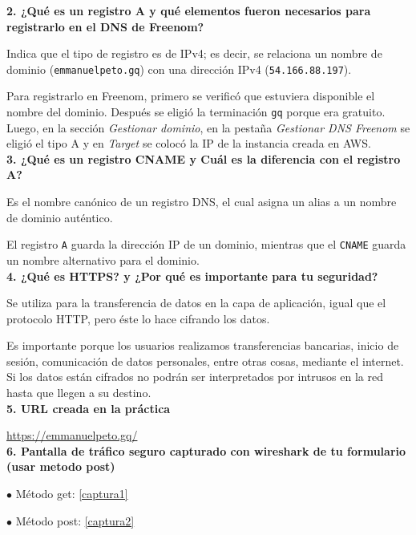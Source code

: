 \documentclass{article}
\begin{document}
\textbf{2. ¿Qué es un registro A y qué elementos fueron necesarios para registrarlo en el DNS de Freenom?}

Indica que el tipo de registro es de IPv4; es decir, se relaciona un nombre de dominio (\texttt{emmanuelpeto.gq}) con una dirección IPv4 (\texttt{54.166.88.197}).

Para registrarlo en Freenom, primero se verificó que estuviera disponible el nombre del dominio. Después se eligió la terminación \texttt{gq} porque era gratuito. Luego, en la sección \textit{Gestionar dominio}, en la pestaña \textit{Gestionar DNS Freenom} se eligió el tipo A y en \textit{Target} se colocó la IP de la instancia creada en AWS.\\

\textbf{3. ¿Qué es un registro CNAME y Cuál es la diferencia con el registro A?}

Es el nombre canónico de un registro DNS, el cual asigna un alias a un nombre de dominio auténtico.

El registro \texttt{A} guarda la dirección IP de un dominio, mientras que el \texttt{CNAME} guarda un nombre alternativo para el dominio.\\

\textbf{4. ¿Qué es HTTPS? y ¿Por qué es importante para tu seguridad?}

Se utiliza para la transferencia de datos en la capa de aplicación, igual que el protocolo HTTP, pero éste lo hace cifrando los datos.

Es importante porque los usuarios realizamos transferencias bancarias, inicio de sesión, comunicación de datos personales, entre otras cosas, mediante el internet. Si los datos están cifrados no podrán ser interpretados por intrusos en la red hasta que llegen a su destino.\\

\textbf{5. URL creada en la práctica}

\url{https://emmanuelpeto.gq/}\\

\textbf{6. Pantalla de tráfico seguro capturado con wireshark de tu formulario (usar metodo post)}

$\bullet$ Método get: \ref{captura1}

$\bullet$ Método post: \ref{captura2}
\end{document}
